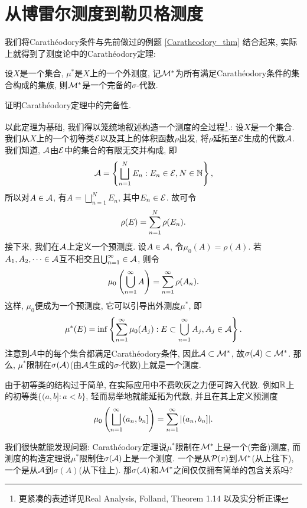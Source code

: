 \section{从博雷尔测度到勒贝格测度}
我们将Carath\'eodory条件与先前做过的例题 \ref{Caratheodory_thm} 结合起来, 实际上就得到了测度论中的Carath\'eodory定理:
\begin{theorem}
    设$X$是一个集合, $\mu^*$是$X$上的一个外测度, 记$\mathcal{M}^*$为所有满足Carath\'eodory条件的集合构成的集族, 则$\mathcal{M}^*$是一个完备的$\sigma$-代数. 
\end{theorem}
\begin{exercise}
    证明Carath\'eodory定理中的完备性. 
\end{exercise}
以此定理为基础, 我们得以笼统地叙述构造一个测度的全过程\footnote{更紧凑的表述详见Real Analysis, Folland, Theorem 1.14 以及实分析正课}.:
     设$X$是一个集合. 我们从$X$上的一个初等类$\mathcal{E}$以及其上的体积函数$\rho$出发, 将$\rho$延拓至$\mathcal{E}$生成的代数$\mathcal{A}$. 我们知道, $\mathcal{A}$由$\mathcal{E}$中的集合的有限无交并构成, 即
     $$\mathcal{A} = \left\{\bigsqcup_{n=1}^{N}E_n: E_n \in \mathcal{E}, N \in \mathbb{N}\right\}, $$
     所以对$A \in \mathcal{A}$, 有$A = \bigsqcup_{n=1}^{N}E_n$, 其中$E_n \in \mathcal{E}$. 故可令
     $$\rho(E) = \sum_{n=1}^{N}\rho(E_n). $$ 接下来, 我们在$\mathcal{A}$上定义一个预测度. 设$A \in \mathcal{A}$, 令$\mu_0(A) = \rho(A)$. 
     若$A_1, A_2, \cdots \in \mathcal{A}$互不相交且$\bigcup_{n=1}^{\infty} \in \mathcal{A}$, 则令
     $$ \mu_0\left(\bigcup_{n=1}^{\infty}A\right) = \sum_{n=1}^{\infty}\rho(A_n). $$
     这样, $\mu_0$便成为一个预测度, 它可以引导出外测度$\mu^*$, 即
    $$\mu^*(E) = \inf \left\{\sum_{n=1}^{\infty}\mu_0(A_j): E \subset \bigcup_{n=1}^{\infty}A_j, A_j \in \mathcal{A}\right\}. $$
    注意到$\mathcal{A}$中的每个集合都满足Carath\'eodory条件, 因此$\mathcal{A} \subset \mathcal{M}^*$, 故$\sigma(\mathcal{A}) \subset \mathcal{M}^*$. 那么, $\mu^*$限制在$\sigma(\mathcal{A})$(由$\mathcal{A}$生成的$\sigma$-代数)上就是一个测度. 
    
\begin{remark}
    由于初等类的结构过于简单, 在实际应用中不费吹灰之力便可跨入代数. 例如$\mathbb{R}$上的初等类$\{(a,b]: a<b\}$, 轻而易举地就能延拓为代数, 并且在其上定义预测度
    $$ \mu_0\left(\bigsqcup_{n=1}^{\infty}(a_n, b_n]\right) = \sum_{n=1}^{\infty}|(a_n, b_n]|. $$
\end{remark}

我们很快就能发现问题: Carath\'eodory定理说$\mu^*$限制在$\mathcal{M}^*$上是一个(完备)测度, 而测度的构造定理说$\mu^*$限制住$\sigma(\mathcal{A})$上是一个测度. 一个是从$\mathcal{P}(x)$到$\mathcal{M}^*$(从上往下), 一个是从$\mathcal{A}$到$\sigma(A)$(从下往上). 那$\sigma(\mathcal{A})$和$\mathcal{M}^*$之间仅仅拥有简单的包含关系吗?

